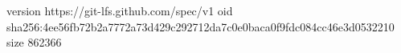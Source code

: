 version https://git-lfs.github.com/spec/v1
oid sha256:4ee56fb72b2a7772a73d429c292712da7c0e0baca0f9fdc084cc46e3d0532210
size 862366
